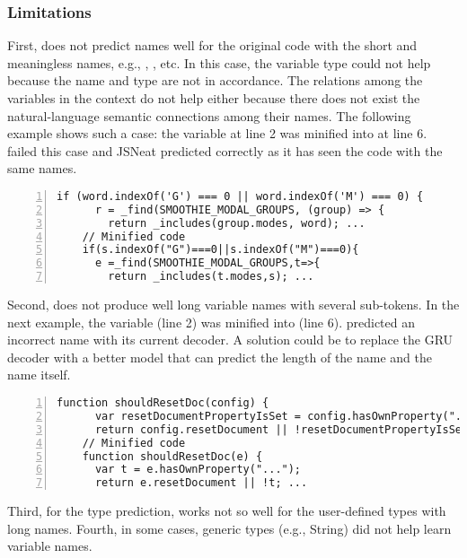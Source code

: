 \vspace{-2pt}
\subsubsection{Limitations}
\label{sec:limitations}


First, {\tool} does not predict names well for the original code with
the short and meaningless names, e.g., , , etc. In
this case, the variable type could not help because the name and type
are not in accordance. The relations among the variables in the
context do not help either because there does not exist the
natural-language semantic connections among their names. The following
example shows such a case: the variable  at line 2 was
minified into  at line 6.  {\tool} failed this case and JSNeat
predicted correctly as it has seen the code with the same names. %
\begin{lstlisting}[basicstyle=\footnotesize\sffamily, stepnumber=1, numbers=left, numbersep=-10pt, framexleftmargin=-2mm,
    framexrightmargin=-2mm]
    if (word.indexOf('G') === 0 || word.indexOf('M') === 0) {
      r = _find(SMOOTHIE_MODAL_GROUPS, (group) => {
        return _includes(group.modes, word); ...
    // Minified code
    if(s.indexOf("G")===0||s.indexOf("M")===0){
      e =_find(SMOOTHIE_MODAL_GROUPS,t=>{
        return _includes(t.modes,s); ...
\end{lstlisting}
Second, {\tool} does not produce well long variable names with several
sub-tokens. In the next example, the variable
 (line 2) was minified
into  (line 6). {\tool} predicted an incorrect
name  with its current decoder.
A solution could be to replace the GRU decoder with a better model
that can predict the length of the name and the name itself.
\begin{lstlisting}[basicstyle=\footnotesize\sffamily, stepnumber=1, numbers=left, numbersep=-10pt, framexleftmargin=-2mm,
    framexrightmargin=-2mm]
    function shouldResetDoc(config) {
      var resetDocumentPropertyIsSet = config.hasOwnProperty("...");
      return config.resetDocument || !resetDocumentPropertyIsSet; ...
    // Minified code
    function shouldResetDoc(e) {
      var t = e.hasOwnProperty("...");
      return e.resetDocument || !t; ...
\end{lstlisting}
Third, for the type prediction, {\tool} works not so well for
the user-defined types with long names. Fourth, in some cases,
generic types (e.g., String) did not help learn variable names.

